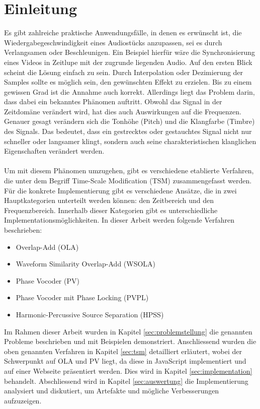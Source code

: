 \section{Einleitung}
Es gibt zahlreiche praktische Anwendungsfälle, in denen es erwünscht ist, die Wiedergabegeschwindigkeit eines Audiostücks anzupassen, sei es durch Verlangsamen oder Beschleunigen. Ein Beispiel hierfür wäre die Synchronisierung eines Videos in Zeitlupe mit der zugrunde liegenden Audio. Auf den ersten Blick scheint die Lösung einfach zu sein. Durch Interpolation oder Dezimierung der Samples sollte es möglich sein, den gewünschten Effekt zu erzielen. Bis zu einem gewissen Grad ist die Annahme auch korrekt. Allerdings liegt das Problem darin, dass dabei ein bekanntes Phänomen auftritt. Obwohl das Signal in der Zeitdomäne verändert wird, hat dies auch Auswirkungen auf die Frequenzen. Genauer gesagt verändern sich die Tonhöhe (Pitch) und die Klangfarbe (Timbre) des Signals. Das bedeutet, dass ein gestrecktes oder gestauchtes Signal nicht nur schneller oder langsamer klingt, sondern auch seine charakter\-istisch\-en klang\-lichen Ei\-genschaften verändert werden. 
\paragraph{}
Um mit diesem Phänomen umzugehen, gibt es verschiedene etablierte Verfahren, die unter dem Begriff Time-Scale Modification (TSM) zusammengefasst werden. Für die konkrete Implementierung gibt es verschiedene Ansätze, die in zwei Hauptkategorien unterteilt werden können: den Zeitbereich und den Frequenzbereich. Innerhalb dieser Kategorien gibt es unterschiedliche Implementationsmöglichkeiten. In dieser Arbeit werden folgende Verfahren beschrieben:
\begin{itemize}
    \item Overlap-Add (OLA)
    \item Waveform Similarity Overlap-Add (WSOLA)
    \item Phase Vocoder (PV)
    \item Phase Vocoder mit Phase Locking (PVPL)
    \item Harmonic-Percussive Source Separation (HPSS)
\end{itemize}
Im Rahmen dieser Arbeit wurden in Kapitel \ref{sec:problemstellung} die genannten Probleme beschrieben und mit Beispielen demonstriert. Anschliessend wurden die oben genannten Verfahren in Kapitel \ref{sec:tsm} detailliert erläutert, wobei der Schwerpunkt auf OLA und PV liegt, da diese in JavaScript implementiert und auf einer Webseite präsentiert werden. Dies wird in Kapitel \ref{sec:implementation} behandelt. Abschliessend wird in Kapitel \ref{sec:auswertung} die Implementierung analysiert und diskutiert, um Artefakte und mögliche Verbesserungen aufzuzeigen.

